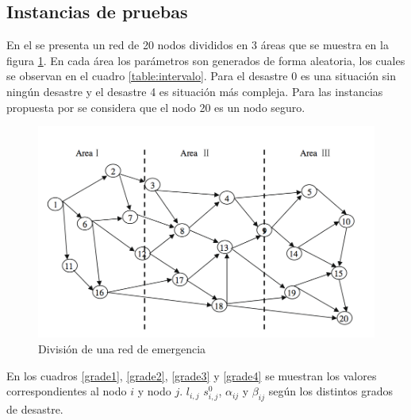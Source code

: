 \subsection{Instancias de pruebas}



En el  \cite{Yuan20091081} se presenta un red de 20 nodos divididos en 3 áreas que se muestra en la figura \ref{area3}. En cada área los parámetros son generados de forma aleatoria, los cuales se observan en el cuadro \ref{table:intervalo}. Para el desastre 0 es una situación sin ningún desastre y el desastre 4 es situación más compleja. Para las instancias propuesta por \cite{Yuan20091081} se considera que el nodo 20 es un nodo seguro.

\begin{figure}[H]
\centering
\includegraphics[scale=0.5]{images/areas.jpg}
\caption{División de una red de emergencia}\label{area3}

\end{figure}

En los cuadros \ref{grade1}, \ref{grade2}, \ref{grade3} y \ref{grade4} se muestran los valores correspondientes al nodo $i$ y nodo $j$. $l_{i,j}$ $s_{i,j}^0$, $\alpha_{ij}$ y $\beta_{ij}$ según los distintos grados de desastre.



